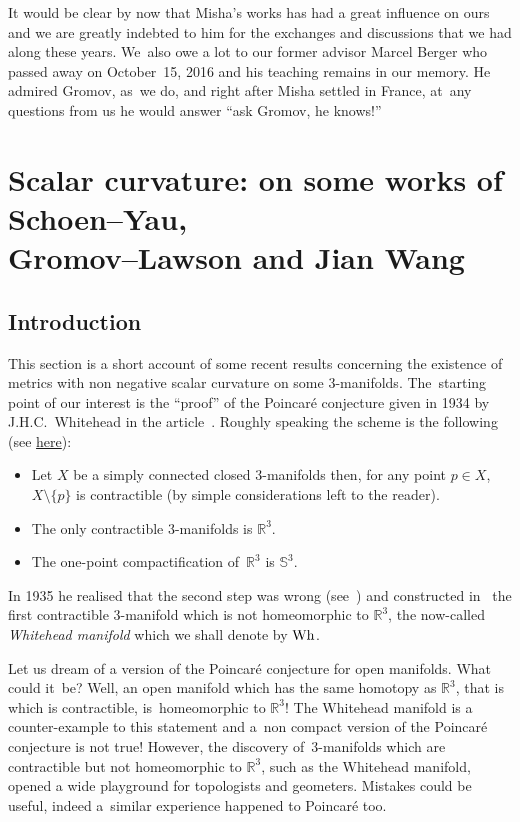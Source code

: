 \documentclass[pdftex]{sigma}
\numberwithin{equation}{section}
\begin{document}
It would be clear by now that Misha's works has had a great influence on
ours and we are greatly indebted to him for the exchanges and discussions
that we had along these years. We~also owe a lot to our former advisor Marcel Berger who passed away on October~15, 2016 and his teaching remains in our memory. He admired Gromov, as~we do, and right after Misha settled
in France, at~any questions from us he would answer ``ask Gromov, he knows!''


\section[Scalar curvature: on some works of Schoen--Yau, Gromov--Lawson and Jian Wang]{Scalar curvature: on some works of Schoen--Yau,\\ Gromov--Lawson and Jian Wang}\label{chap:scalar}

\subsection{Introduction}\label{intro:scalar}

This section is a short account of some recent results concerning the existence of metrics with non negative scalar curvature on some $3$-manifolds. The~starting point of our interest is the ``proof'' of the Poincar\'e conjecture given in 1934 by J.H.C.~Whitehead in the article~\cite{White1}. Roughly speaking the scheme is the following (see \href{https://www.math.unl.edu/~mbrittenham2/ldt/poincare.html}{here}):
\begin{itemize}\itemsep=-.2pt
 \item Let $X$ be a simply connected closed $3$-manifolds then, for any point $p\in X$, $X\setminus\{p\}$ is contractible (by simple considerations left to the reader).
 \item The only contractible $3$-manifolds is $\mathbb{R}^3$.
 \item The one-point compactification of~$\mathbb{R}^3$ is $\mathbb{S}^3$.
\end{itemize}
In 1935 he realised that the second step was wrong (see~\cite{White2}) and constructed in~\cite{White3} the first contractible $3$-manifold which is not homeomorphic to $\mathbb{R}^3$, the now-called \textit{Whitehead manifold} which we shall denote by $\rm Wh$.

Let us dream of a version of the Poincar\'e conjecture for open manifolds. What could it~be? Well, an open manifold which has the same homotopy as $\mathbb{R}^3$, that is which is contractible, is~homeomorphic to $\mathbb{R}^3$! The Whitehead manifold is a counter-example to this statement and a~non compact version of the Poincar\'e conjecture is not true! However, the discovery of~$3$-mani\-folds which are contractible but not homeomorphic to $\mathbb{R}^3$, such as the Whitehead manifold, opened a wide playground for topologists and geometers. Mistakes could be useful, indeed a~similar experience happened to Poincar\'e too.
\end{document}
